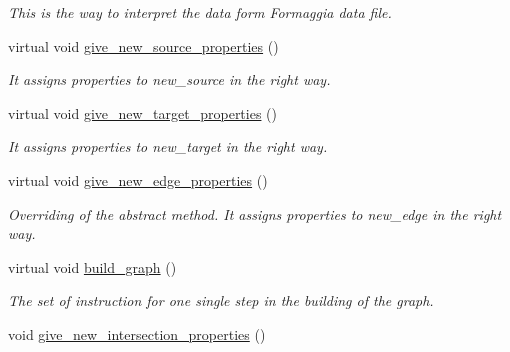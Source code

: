 \begin{DoxyCompactItemize}
\begin{DoxyCompactList}\small\item\em This is the way to interpret the data form Formaggia data file. \item\end{DoxyCompactList}\item 
\hypertarget{classfinal_ae29bd829f7aad36aeb6f5dd406a4c46b}{
virtual void \hyperlink{classfinal_ae29bd829f7aad36aeb6f5dd406a4c46b}{give\_\-new\_\-source\_\-properties} ()}
\label{classfinal_ae29bd829f7aad36aeb6f5dd406a4c46b}

\begin{DoxyCompactList}\small\item\em It assigns properties to new\_\-source in the right way. \item\end{DoxyCompactList}\item 
\hypertarget{classfinal_a97180567f0bdc0d6883e8f19bee5e3f3}{
virtual void \hyperlink{classfinal_a97180567f0bdc0d6883e8f19bee5e3f3}{give\_\-new\_\-target\_\-properties} ()}
\label{classfinal_a97180567f0bdc0d6883e8f19bee5e3f3}

\begin{DoxyCompactList}\small\item\em It assigns properties to new\_\-target in the right way. \item\end{DoxyCompactList}\item 
\hypertarget{classfinal_af1ee4d51186fa9bc163acaf782587206}{
virtual void \hyperlink{classfinal_af1ee4d51186fa9bc163acaf782587206}{give\_\-new\_\-edge\_\-properties} ()}
\label{classfinal_af1ee4d51186fa9bc163acaf782587206}

\begin{DoxyCompactList}\small\item\em Overriding of the abstract method. It assigns properties to new\_\-edge in the right way. \item\end{DoxyCompactList}\item 
\hypertarget{classfinal_aa255f95f3c187ac566dc1160dde9db2f}{
virtual void \hyperlink{classfinal_aa255f95f3c187ac566dc1160dde9db2f}{build\_\-graph} ()}
\label{classfinal_aa255f95f3c187ac566dc1160dde9db2f}

\begin{DoxyCompactList}\small\item\em The set of instruction for one single step in the building of the graph. \item\end{DoxyCompactList}\item 
\hypertarget{classfinal_a9779555b5bd6c6e63c5b3a306b842e56}{
void \hyperlink{classfinal_a9779555b5bd6c6e63c5b3a306b842e56}{give\_\-new\_\-intersection\_\-properties} ()}
\label{classfinal_a9779555b5bd6c6e63c5b3a306b842e56}


\end{DoxyCompactItemize}
